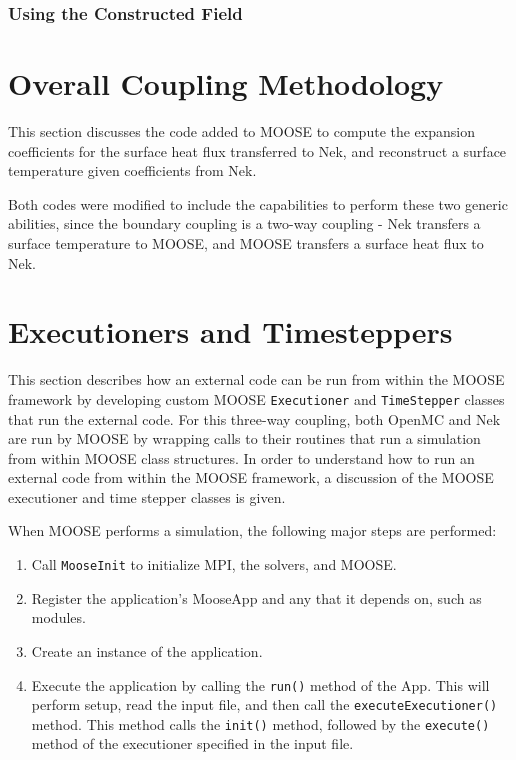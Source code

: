 \documentclass[10pt]{article}
\numberwithin{equation}{section} %
\begin{document}
\subsubsection{Using the Constructed Field}

\section{Overall Coupling Methodology}
This section discusses the code added to MOOSE to compute the expansion coefficients for the surface heat flux transferred to Nek, and reconstruct a surface temperature given coefficients from Nek.

Both codes were modified to include the capabilities to perform these two generic abilities, since the boundary coupling is a two-way coupling - Nek transfers a surface temperature to MOOSE, and MOOSE transfers a surface heat flux to Nek. 

\section{Executioners and Timesteppers}
This section describes how an external code can be run from within the MOOSE framework by developing custom MOOSE {\tt Executioner} and {\tt TimeStepper} classes that run the external code. For this three-way coupling, both OpenMC and Nek are run by MOOSE by wrapping calls to their routines that run a simulation from within MOOSE class structures. In order to understand how to run an external code from within the MOOSE framework, a discussion of the MOOSE executioner and time stepper classes is given. 

When MOOSE performs a simulation, the following major steps are performed:

\begin{enumerate}
\item Call {\tt MooseInit} to initialize MPI, the solvers, and MOOSE.
\item Register the application's MooseApp and any that it depends on, such as modules. 
\item Create an instance of the application.
\item Execute the application by calling the {\tt run()} method of the App. This will perform setup, read the input file, and then call the {\tt executeExecutioner()} method. This method calls the {\tt init()} method, followed by the {\tt execute()} method of the executioner specified in the input file.
\end{enumerate}
\end{document}
